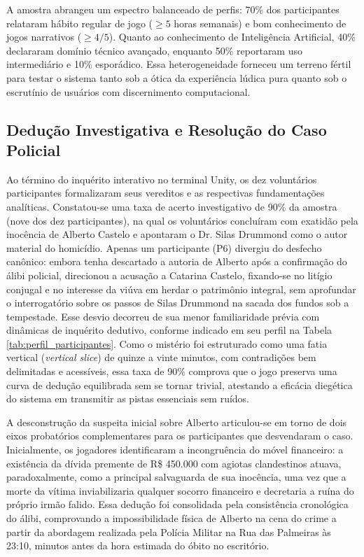 A amostra abrangeu um espectro balanceado de perfis: 70\% dos participantes relataram hábito regular de jogo ($\ge 5$ horas semanais) e bom conhecimento de jogos narrativos ($\ge 4/5$). Quanto ao conhecimento de Inteligência Artificial, 40\% declararam domínio técnico avançado, enquanto 50\% reportaram uso intermediário e 10\% esporádico. Essa heterogeneidade forneceu um terreno fértil para testar o sistema tanto sob a ótica da experiência lúdica pura quanto sob o escrutínio de usuários com discernimento computacional.

\subsection{Dedução Investigativa e Resolução do Caso Policial}
Ao término do inquérito interativo no terminal Unity, os dez voluntários participantes formalizaram seus vereditos e as respectivas fundamentações analíticas. Constatou-se uma taxa de acerto investigativo de 90\% da amostra (nove dos dez participantes), na qual os voluntários concluíram com exatidão pela inocência de Alberto Castelo e apontaram o Dr. Silas Drummond como o autor material do homicídio. Apenas um participante (P6) divergiu do desfecho canônico: embora tenha descartado a autoria de Alberto após a confirmação do álibi policial, direcionou a acusação a Catarina Castelo, fixando-se no litígio conjugal e no interesse da viúva em herdar o patrimônio integral, sem aprofundar o interrogatório sobre os passos de Silas Drummond na sacada dos fundos sob a tempestade. Esse desvio decorreu de sua menor familiaridade prévia com dinâmicas de inquérito dedutivo, conforme indicado em seu perfil na Tabela \ref{tab:perfil_participantes}. Como o mistério foi estruturado como uma fatia vertical (\textit{vertical slice}) de quinze a vinte minutos, com contradições bem delimitadas e acessíveis, essa taxa de 90\% comprova que o jogo preserva uma curva de dedução equilibrada sem se tornar trivial, atestando a eficácia diegética do sistema em transmitir as pistas essenciais sem ruídos.

A desconstrução da suspeita inicial sobre Alberto articulou-se em torno de dois eixos probatórios complementares para os participantes que desvendaram o caso. Inicialmente, os jogadores identificaram a incongruência do móvel financeiro: a existência da dívida premente de R\$ 450.000 com agiotas clandestinos atuava, paradoxalmente, como a principal salvaguarda de sua inocência, uma vez que a morte da vítima inviabilizaria qualquer socorro financeiro e decretaria a ruína do próprio irmão falido. Essa dedução foi consolidada pela consistência cronológica do álibi, comprovando a impossibilidade física de Alberto na cena do crime a partir da abordagem realizada pela Polícia Militar na Rua das Palmeiras às 23:10, minutos antes da hora estimada do óbito no escritório.

